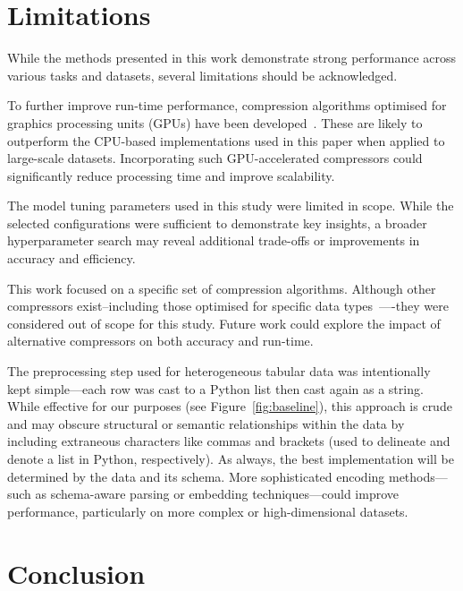 \documentclass[preprint,12pt]{article}
\begin{document}
\section{Limitations}
\label{limitations}
While the methods presented in this work demonstrate strong performance across various tasks and datasets, several limitations should be acknowledged.

To further improve run-time performance, compression algorithms optimised for graphics processing units (GPUs) have been developed~\cite{gpu_compression}.
These are likely to outperform the CPU-based implementations used in this paper when applied to large-scale datasets.
Incorporating such GPU-accelerated compressors could significantly reduce processing time and improve scalability.

The model tuning parameters used in this study were limited in scope.
While the selected configurations were sufficient to demonstrate key insights, a broader hyperparameter search may reveal additional trade-offs or improvements in accuracy and efficiency.

This work focused on a specific set of compression algorithms.
Although other compressors exist--including those optimised for specific data types~\cite{gpu_compression,mp3,hevc}—-they were considered out of scope for this study.
Future work could explore the impact of alternative compressors on both accuracy and run-time.

The preprocessing step used for heterogeneous tabular data was intentionally kept simple---each row was cast to a Python list then cast again as a string.
While effective for our purposes (see Figure~\ref{fig:baseline}), this approach is crude and may obscure structural or semantic relationships within the data by including extraneous characters like commas and brackets (used to delineate and denote a list in Python, respectively).
As always, the best implementation will be determined by the data and its schema.
More sophisticated encoding methods—such as schema-aware parsing or embedding techniques—could improve performance, particularly on more complex or high-dimensional datasets.




\section{Conclusion}
\label{conclusion}
\end{document}
